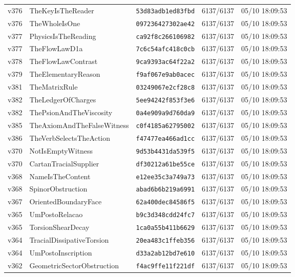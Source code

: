 \documentclass[11pt]{article}
\theoremstyle{definition}\newtheorem{deriv}{Derivação}
\begin{document}
{\begin{longtable}{@{}lllll@{}}
v376 & TheKeyIsTheReader & \texttt{53d83adb1ed83fbd} & 6137/6137 & 05/10 18:09:53 \\
v376 & TheWholeIsOne & \texttt{097236427302ae42} & 6137/6137 & 05/10 18:09:53 \\
v377 & PhysicsIsTheReading & \texttt{ca92f8c266106982} & 6137/6137 & 05/10 18:09:53 \\
v377 & TheFlowLawD1a & \texttt{7c6c54afc418c0cb} & 6137/6137 & 05/10 18:09:53 \\
v378 & TheFlowLawContrast & \texttt{9ca9393ac64f22a2} & 6137/6137 & 05/10 18:09:53 \\
v379 & TheElementaryReason & \texttt{f9af067e9ab0acec} & 6137/6137 & 05/10 18:09:53 \\
v381 & TheMatrixRule & \texttt{03249067e2cf28c8} & 6137/6137 & 05/10 18:09:53 \\
v382 & TheLedgerOfCharges & \texttt{5ee94242f853f3e6} & 6137/6137 & 05/10 18:09:53 \\
v382 & ThePsionAndTheViscosity & \texttt{0a4e909a9d760da9} & 6137/6137 & 05/10 18:09:53 \\
v385 & TheAxiomAndTheFalseWitness & \texttt{c0f4185a62795002} & 6137/6137 & 05/10 18:09:53 \\
v386 & TheVerbSelectsTheAction & \texttt{f47477ea466ad1cc} & 6137/6137 & 05/10 18:09:53 \\
v370 & NotIsEmptyWitness & \texttt{9d53b4431da539f5} & 6137/6137 & 05/10 18:09:53 \\
v370 & CartanTracialSupplier & \texttt{df30212a61be55ce} & 6137/6137 & 05/10 18:09:53 \\
v368 & NameIsTheContent & \texttt{e12ee35c3a749a73} & 6137/6137 & 05/10 18:09:53 \\
v368 & SpinorObstruction & \texttt{abad6b6b219a6991} & 6137/6137 & 05/10 18:09:53 \\
v367 & OrientedBoundaryFace & \texttt{62a400dec84586f5} & 6137/6137 & 05/10 18:09:53 \\
v365 & UmPostoRelacao & \texttt{b9c3d348cdd24fc7} & 6137/6137 & 05/10 18:09:53 \\
v365 & TorsionShearDecay & \texttt{1ca0a55b411b6629} & 6137/6137 & 05/10 18:09:53 \\
v364 & TracialDissipativeTorsion & \texttt{20ea483c1ffeb356} & 6137/6137 & 05/10 18:09:53 \\
v364 & UmPostoInscription & \texttt{d33a2ab12bd7e610} & 6137/6137 & 05/10 18:09:53 \\
v362 & GeometricSectorObstruction & \texttt{f4ac9ffe11f221df} & 6137/6137 & 05/10 18:09:53 \\

\end{longtable}}
\end{document}
